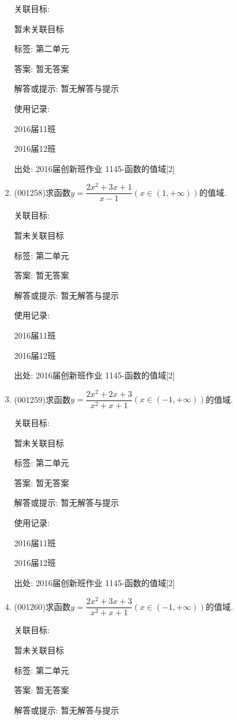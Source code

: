 \documentclass[10pt,a4paper]{article}
\begin{document}
\begin{enumerate}[1.]
关联目标:

暂未关联目标



标签: 第二单元

答案: 暂无答案

解答或提示: 暂无解答与提示

使用记录:

2016届11班	

2016届12班	


出处: 2016届创新班作业	1145-函数的值域[2]
\item { (001258)}求函数$y=\dfrac{2x^2+3x+1}{x-1}(x\in(1,+\infty))$的值域.


关联目标:

暂未关联目标



标签: 第二单元

答案: 暂无答案

解答或提示: 暂无解答与提示

使用记录:

2016届11班	

2016届12班	


出处: 2016届创新班作业	1145-函数的值域[2]
\item { (001259)}求函数$y=\dfrac{2x^2+2x+3}{x^2+x+1}(x\in(-1,+\infty))$的值域.


关联目标:

暂未关联目标



标签: 第二单元

答案: 暂无答案

解答或提示: 暂无解答与提示

使用记录:

2016届11班	

2016届12班	


出处: 2016届创新班作业	1145-函数的值域[2]
\item { (001260)}求函数$y=\dfrac{2x^2+3x+3}{x^2+x+1}(x\in(-1,+\infty))$的值域.


关联目标:

暂未关联目标



标签: 第二单元

答案: 暂无答案

解答或提示: 暂无解答与提示


\end{enumerate}
\end{document}
